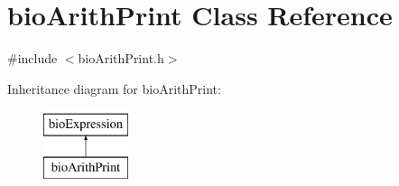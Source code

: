 \hypertarget{classbio_arith_print}{}\section{bio\+Arith\+Print Class Reference}
\label{classbio_arith_print}


{\ttfamily \#include $<$bio\+Arith\+Print.\+h$>$}

Inheritance diagram for bio\+Arith\+Print\+:\begin{figure}[H]
\begin{center}
\leavevmode
\includegraphics[height=2.000000cm]{classbio_arith_print}
\end{center}
\end{figure}
